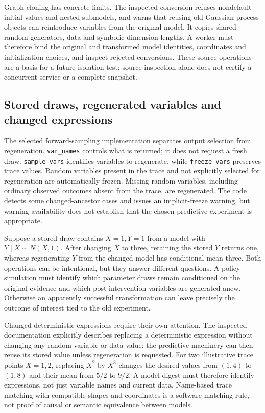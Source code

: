Graph cloning has concrete limits. The inspected conversion refuses
nondefault initial values and nested submodels, and warns that reusing old
Gaussian-process objects can reintroduce variables from the original model.
It copies shared random generators, data and symbolic dimension lengths.
A worker must therefore bind the original and transformed model identities,
coordinates and initialization choices, and inspect rejected conversions.
These source operations are a basis for a future isolation test; source
inspection alone does not certify a concurrent service or a complete snapshot.
\citep{exec23_pymc_sources}

\subsection{Stored draws, regenerated variables and changed expressions}
\label{exec23:pymc-prediction}

The selected forward-sampling implementation separates output selection from
regeneration. \texttt{var\_names} controls what is returned; it does not request
a fresh draw. \texttt{sample\_vars} identifies variables to regenerate, while
\texttt{freeze\_vars} preserves trace values. Random variables present in the
trace and not explicitly selected for regeneration are automatically frozen.
Missing random variables, including ordinary observed outcomes absent from
the trace, are regenerated. The code detects some changed-ancestor cases and
issues an implicit-freeze warning, but warning availability does not establish
that the chosen predictive experiment is appropriate.
\citep{exec23_pymc_sources}

Suppose a stored draw contains $X=1,Y=1$ from a model with
$Y\mid X\sim N(X,1)$. After changing $X$ to three, retaining the stored $Y$
returns one, whereas regenerating $Y$ from the changed model has conditional
mean three. Both operations can be intentional, but they answer different
questions. A policy simulation must identify which parameter draws remain
conditioned on the original evidence and which post-intervention variables
are generated anew. Otherwise an apparently successful transformation can
leave precisely the outcome of interest tied to the old experiment.
\citep{exec23_pymc_sources,exec23_pymc_reference}

Changed deterministic expressions require their own attention. The inspected
documentation explicitly describes replacing a deterministic expression without
changing any random variable or data value: the predictive machinery can then
reuse its stored value unless regeneration is requested. For two illustrative
trace points $X=1,2$, replacing $X^2$ by $X^3$ changes the desired values from
$(1,4)$ to $(1,8)$ and their mean from $5/2$ to $9/2$. A model digest must
therefore identify expressions, not just variable names and current data.
Name-based trace matching with compatible shapes and coordinates is a software
matching rule, not proof of causal or semantic equivalence between models.
\citep{exec23_pymc_sources,exec23_pymc_reference}

